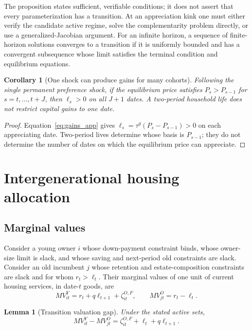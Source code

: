 \documentclass[11pt]{article}
\newtheorem{lemma}{Lemma}
\newtheorem{corollary}{Corollary}
\theoremstyle{definition}
\theoremstyle{remark}
\begin{document}
The proposition states sufficient, verifiable conditions; it does not assert
that every parameterization has a transition.  At an appreciation kink one
must either verify the candidate active regime, solve the complementarity
problem directly, or use a generalized-Jacobian argument.  For an infinite
horizon, a sequence of finite-horizon solutions converges to a transition if
it is uniformly bounded and has a convergent subsequence whose limit satisfies
the terminal condition and equilibrium equations.

\begin{corollary}[One shock can produce gains for many cohorts]
Following the single permanent preference shock, if the equilibrium price
satisfies $P_s>P_{s-1}$ for $s=t,\ldots,t+J$, then
$\ell_s>0$ on all $J+1$ dates.  A two-period household life does not restrict
capital gains to one date.
\end{corollary}

\begin{proof}
Equation~\eqref{eq:gains_app} gives
$\ell_s=\tau^g(P_s-P_{s-1})>0$ on each appreciating date.  Two-period lives
determine whose basis is $P_{s-1}$; they do not determine the number of dates on
which the equilibrium price can appreciate.
\end{proof}

\section{Intergenerational housing allocation}

\subsection{Marginal values}

Consider a young owner $i$ whose down-payment constraint binds, whose owner-size
limit is slack, and whose saving and next-period old constraints are slack.
Consider an old incumbent $j$ whose retention and estate-composition constraints
are slack and for whom $r_t>\ell_t$.  Their marginal values of one unit of
current housing services, in date-$t$ goods, are
\begin{equation}
 MV_{it}^Y=r_t+q\ell_{t+1}+\zeta_{it}^{O,F},
 \qquad
 MV_{jt}^O=r_t-\ell_t.
 \label{eq:pair_values_app}
\end{equation}

\begin{lemma}[Transition valuation gap]
Under the stated active sets,
\begin{equation}
 MV_{it}^Y-MV_{jt}^O
 =\zeta_{it}^{O,F}+\ell_t+q\ell_{t+1}.
 \label{eq:valuation_gap_app}
\end{equation}
\end{lemma}
\end{document}
